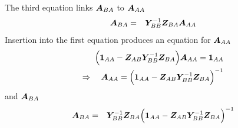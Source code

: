 \documentclass[11pt,a4paper]{report}
\begin{document}
The third equation links $\bm{A}_{BA}$ to $\bm{A}_{AA}$
\begin{eqnarray}
\bm{A}_{BA}&=&\bm{Y}_{BB}^{-1}\bm{Z}_{BA}\bm{A}_{AA}
\end{eqnarray}
Insertion into the first equation produces an equation for $\bm{A}_{AA}$
\begin{eqnarray}
\Bigl(\bm{1}_{AA}-\bm{Z}_{AB}\bm{Y}_{BB}^{-1}\bm{Z}_{BA}\Bigr)\bm{A}_{AA}
=\bm{1}_{AA}
\nonumber\\
\Rightarrow\quad
\bm{A}_{AA}=\Bigl(\bm{1}_{AA}-\bm{Z}_{AB}\bm{Y}_{BB}^{-1}\bm{Z}_{BA}
\Bigr)^{-1}
\end{eqnarray}
and $\bm{A}_{BA}$
\begin{eqnarray}
\bm{A}_{BA}&=&\bm{Y}_{BB}^{-1}\bm{Z}_{BA}
\Bigl(\bm{1}_{AA}-\bm{Z}_{AB}\bm{Y}_{BB}^{-1}\bm{Z}_{BA}\Bigr)^{-1}
\end{eqnarray}


\end{document}
